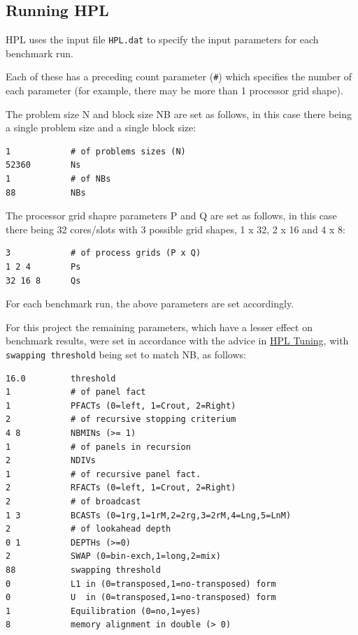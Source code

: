 \documentclass{report}
\begin{document}
%
%
\subsection{Running HPL}

HPL uses the input file \verb|HPL.dat| to specify the input parameters for each benchmark run.

Each of these has a preceding count parameter (\verb|#|) which specifies the number of each parameter (for example, there may be more than 1 processor grid shape).

The problem size N and block size NB are set as follows, in this case there being a single problem size and a single block size:

\lstset{style=listing}
\begin{lstlisting}[numbers=none, caption=HPL.dat]
1            # of problems sizes (N)
52360        Ns
1            # of NBs
88           NBs
\end{lstlisting}

The processor grid shapre parameters P and Q are set as follows, in this case there being 32 cores/slots with 3 possible grid shapes, 1 x 32, 2 x 16 and 4 x 8:

\lstset{style=listing}
\begin{lstlisting}[numbers=none, caption=HPL.dat]
3            # of process grids (P x Q)
1 2 4        Ps
32 16 8      Qs
\end{lstlisting}

For each benchmark run, the above parameters are set accordingly.

For this project the remaining parameters, which have a lesser effect on benchmark results, were set in accordance with the advice in \href{https://www.netlib.org/benchmark/hpl/tuning.html}{HPL Tuning}, with \verb|swapping threshold| being set to match NB, as follows:

\lstset{style=listing}
\begin{lstlisting}[numbers=none, caption=HPL.dat]
16.0         threshold
1            # of panel fact
1            PFACTs (0=left, 1=Crout, 2=Right)
2            # of recursive stopping criterium
4 8          NBMINs (>= 1)
1            # of panels in recursion
2            NDIVs
1            # of recursive panel fact.
2            RFACTs (0=left, 1=Crout, 2=Right)
2            # of broadcast
1 3          BCASTs (0=1rg,1=1rM,2=2rg,3=2rM,4=Lng,5=LnM)
2            # of lookahead depth
0 1          DEPTHs (>=0)
2            SWAP (0=bin-exch,1=long,2=mix)
88           swapping threshold
0            L1 in (0=transposed,1=no-transposed) form
0            U  in (0=transposed,1=no-transposed) form
1            Equilibration (0=no,1=yes)
8            memory alignment in double (> 0)
\end{lstlisting}
\end{document}
